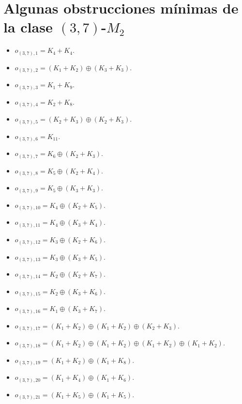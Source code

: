 \section{Algunas obstrucciones mínimas de la clase $(3,7)$-$M_2$}
\begin{itemize}
    \item $o_{(3,7),1} = K_4+K_4$.
    \item $o_{(3,7),2} = (K_1+K_2)\oplus(K_3+K_3)$.
    \item $o_{(3,7),3} = K_1+K_9$.
    \item $o_{(3,7),4} = K_2+K_8$.
    \item $o_{(3,7),5} = (K_2+K_3)\oplus(K_2+K_3)$.
    \item $o_{(3,7),6} = K_{11}$.
    \item $o_{(3,7),7} = K_6\oplus(K_2+K_3)$.
    \item $o_{(3,7),8} = K_5\oplus(K_2+K_4)$.
    \item $o_{(3,7),9} = K_5\oplus(K_3+K_3)$.
    \item $o_{(3,7),10} = K_4\oplus(K_2+K_5)$.
    \item $o_{(3,7),11} = K_4\oplus(K_3+K_4)$.
    \item $o_{(3,7),12} = K_3\oplus(K_2+K_6)$.
    \item $o_{(3,7),13} = K_3\oplus(K_3+K_5)$.
    \item $o_{(3,7),14} = K_2\oplus(K_2+K_7)$.
    \item $o_{(3,7),15} = K_2\oplus(K_3+K_6)$.
    \item $o_{(3,7),16} = K_1\oplus(K_3+K_7)$.
    \item $o_{(3,7),17} = (K_1+K_2)\oplus(K_1+K_2)\oplus(K_2+K_3)$.
    \item $o_{(3,7),18} = (K_1+K_2)\oplus(K_1+K_2)\oplus(K_1+K_2)\oplus(K_1+K_2)$.
    \item $o_{(3,7),19} = (K_1+K_2)\oplus(K_1+K_8)$.
    \item $o_{(3,7),20} = (K_1+K_4)\oplus(K_1+K_6)$.
    \item $o_{(3,7),21} = (K_1+K_5)\oplus(K_1+K_5)$.
\end{itemize}

